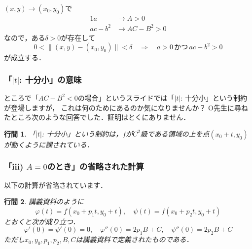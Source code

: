 \documentclass{article}
\makeatletter
\renewenvironment{proof}[1][\proofname]{\par
        \pushQED{\qed}
        \normalfont
        \topsep6\p@\@plus6\p@ \trivlist
        \item[\hskip\labelsep{\bfseries #1}\@addpunct{\bfseries}]\ignorespaces
    }{%
        \popQED\endtrivlist\@endpefalse
    }
\renewcommand{\proofname}{\underline{証明.}}
\newtheorem{lemma}{行間}
\makeatother
\begin{document}
\begin{proof}
    $(x, y) \rightarrow (x_0, y_0)$で
    \begin{alignat}{1}
        a &\rightarrow A > 0 \\
        ac - b^2 &\rightarrow AC - B^2 > 0
    \end{alignat}
    なので，ある$\delta > 0$が存在して
    \begin{equation}
        0 < \| (x, y) - (x_0, y_0) \| < \delta
        \quad \Longrightarrow \quad
        a > 0
        \,\mbox{かつ}\,
        ac - b^2 > 0
    \end{equation}
    が成立する．
\end{proof}

\subsubsection{「$|t|$: 十分小」の意味}
ところで「$AC-B^2<0$の場合」というスライドでは「$|t|$: 十分小」という制約が登場しますが，
これは何のためにあるのか気になりませんか？
O先生に尋ねたところ次のような回答でした．証明はとくにありません．
\begin{screen}
    \begin{lemma}
        「$|t|$: 十分小」という制約は，$f$が$C^2$級である領域の上を点$(x_0 + t, y_0)$が動くように課されている．
    \end{lemma}
\end{screen}

\subsubsection{「iii) $A=0$のとき」の省略された計算}
以下の計算が省略されています．
\begin{screen}
    \begin{lemma}
        講義資料のように
        \begin{equation}
            \varphi(t) = f(x_0 + p_1 t, y_0 + t),
            \quad
            \psi(t)    = f(x_0 + p_2 t, y_0 + t)
        \end{equation}
        とおくと次が成り立つ．
        \begin{equation}
            \varphi'(0) = \psi'(0) = 0,
            \quad
            \varphi''(0) = 2p_1 B + C,
            \quad
            \psi''(0)    = 2p_2 B + C
        \end{equation}
        ただし$x_0, y_0, p_1, p_2, B, C$は講義資料で定義されたものである．
    \end{lemma}
\end{screen}
\end{document}
